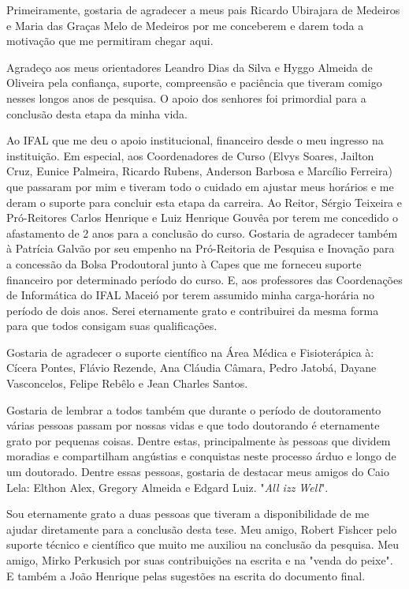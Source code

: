 Primeiramente, gostaria de agradecer a meus pais Ricardo Ubirajara de Medeiros e Maria das Graças Melo de Medeiros por me conceberem e darem toda a motivação que me permitiram chegar aqui.

Agradeço aos meus orientadores Leandro Dias da Silva e Hyggo Almeida de Oliveira pela confiança, suporte, compreensão e paciência que tiveram comigo nesses longos anos de pesquisa. O apoio dos senhores foi primordial para a conclusão desta etapa da minha vida.

Ao IFAL que me deu o apoio institucional, financeiro desde o meu ingresso na instituição. Em especial, aos Coordenadores de Curso (Elvys Soares, Jailton Cruz, Eunice Palmeira, Ricardo Rubens, Anderson Barbosa e Marcílio Ferreira) que passaram por mim e tiveram todo o cuidado em ajustar meus horários e me deram o suporte para concluir esta etapa da carreira. Ao Reitor, Sérgio Teixeira e Pró-Reitores Carlos Henrique e Luiz Henrique Gouvêa por terem me concedido o afastamento de 2 anos para a conclusão do curso. Gostaria de agradecer também à Patrícia Galvão por seu empenho na Pró-Reitoria de Pesquisa e Inovação para a concessão da Bolsa Prodoutoral junto à Capes que me forneceu suporte financeiro por determinado período do curso. E, aos professores das Coordenações de Informática do IFAL Maceió por terem assumido minha carga-horária no período de dois anos. Serei eternamente grato e contribuirei da mesma forma para que todos consigam suas qualificações.

Gostaria de agradecer o suporte científico na Área Médica e Fisioterápica à: Cícera Pontes, Flávio Rezende, Ana Cláudia Câmara, Pedro Jatobá, Dayane Vasconcelos, Felipe Rebêlo e Jean Charles Santos.

Gostaria de lembrar a todos também que durante o período de doutoramento várias pessoas passam por nossas vidas e que todo doutorando é eternamente grato por pequenas coisas. Dentre estas, principalmente às pessoas que dividem moradias e compartilham angústias e conquistas neste processo árduo e longo de um doutorado. Dentre essas pessoas, gostaria de destacar meus amigos do Caio Lela: Elthon Alex, Gregory Almeida e Edgard Luiz. "\textit{All izz Well}".

Sou eternamente grato a duas pessoas que tiveram a disponibilidade de me ajudar diretamente para a conclusão desta tese. Meu amigo, Robert Fishcer pelo suporte técnico e científico que muito me auxiliou na conclusão da pesquisa. Meu amigo, Mirko Perkusich por suas contribuições na escrita e na "venda do peixe". E também a João Henrique pelas sugestões na escrita do documento final.

